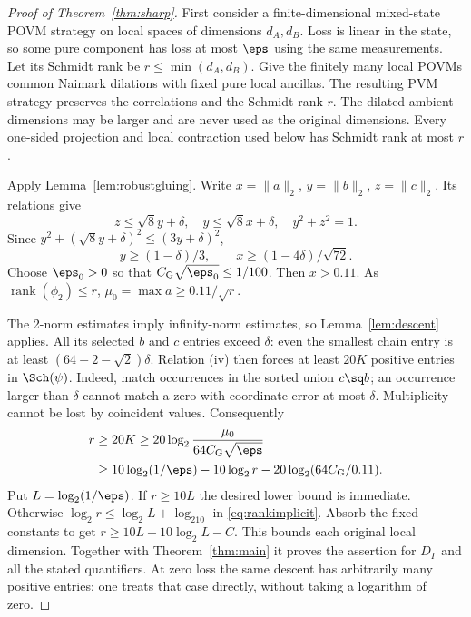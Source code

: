 \begin{proof}[Proof of Theorem~\ref{thm:sharp}]
First consider a finite-dimensional mixed-state POVM strategy on local
spaces of dimensions $d_A,d_B$. Loss is linear in the state, so some
pure component has loss at most $\eps$ using the same measurements.
Let its Schmidt rank be $r\leq\min(d_A,d_B)$.
Give the finitely many local POVMs common Naimark dilations with fixed
pure local ancillas. The resulting PVM strategy preserves the
correlations and the Schmidt rank $r$. The dilated ambient dimensions
may be larger and are never used as the original dimensions. Every
one-sided projection and local contraction used below has Schmidt rank
at most $r$.

Apply Lemma~\ref{lem:robustgluing}. Write
$x=\|a\|_2$, $y=\|b\|_2$, $z=\|c\|_2$.
Its relations give
\[
z\leq\sqrt8y+\delta,\quad y\leq\sqrt8x+\delta,\quad y^2+z^2=1.
\]
Since $y^2+(\sqrt8y+\delta)^2\leq(3y+\delta)^2$,
\begin{equation}\label{eq:sectorweight}
y\geq(1-\delta)/3,\qquad
x\geq(1-4\delta)/\sqrt{72}.
\end{equation}
Choose $\eps_0>0$ so that $C_{\rm G}\sqrt{\eps_0}\leq1/100$.
Then $x>0.11$. As $\operatorname{rank}(\phi_2)\leq r$,
$\mu_0=\max a\geq0.11/\sqrt r$.

The 2-norm estimates imply infinity-norm estimates, so
Lemma~\ref{lem:descent} applies. All its selected $b$ and $c$ entries
exceed $\delta$: even the smallest chain entry is at least
$(64-2-\sqrt2)\delta$.
Relation (iv) then forces at least $20K$ positive entries in
$\Sch(\psi)$. Indeed, match occurrences in the sorted union
$c\sq b$; an occurrence larger than $\delta$ cannot match a zero
with coordinate error at most $\delta$. Multiplicity cannot be lost
by coincident values. Consequently
\begin{align}\label{eq:rankimplicit}
r&\geq20K\geq20\log_2\frac{\mu_0}{64C_{\rm G}\sqrt\eps}\nonumber\\
&\geq10\log_2(1/\eps)-10\log_2r
 -20\log_2(64C_{\rm G}/0.11).
\end{align}
Put $L=\log_2(1/\eps)$. If $r\geq10L$ the desired lower bound is
immediate. Otherwise $\log_2r\leq\log_2L+\log_210$ in
\eqref{eq:rankimplicit}. Absorb the fixed constants to get
$r\geq10L-10\log_2L-C$. This bounds each original local dimension.
Together with Theorem~\ref{thm:main} it proves the assertion for
$D_\Gamma$ and all the stated quantifiers.
At zero loss the same descent has arbitrarily many positive entries;
one treats that case directly, without taking a logarithm of zero.
\end{proof}
